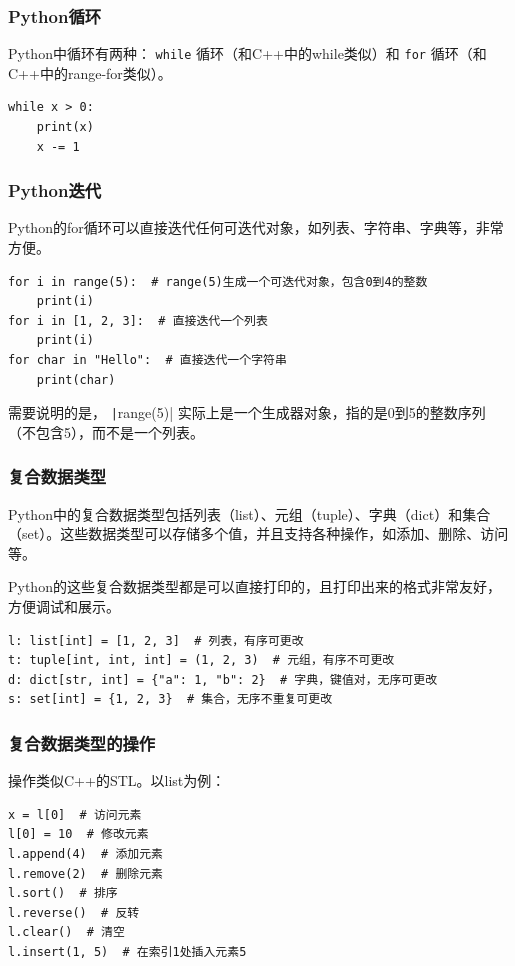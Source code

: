 \begin{frame}[fragile]
    \frametitle{Python循环}

    Python中循环有两种： \texttt{while} 循环（和C++中的while类似）和 \texttt{for} 循环（和C++中的range-for类似）。
    \begin{verbatim}
while x > 0:
    print(x)
    x -= 1
    \end{verbatim}
\end{frame}

\begin{frame}[fragile]
    \frametitle{Python迭代}

    Python的for循环可以直接迭代任何可迭代对象，如列表、字符串、字典等，非常方便。
    \begin{verbatim}
for i in range(5):  # range(5)生成一个可迭代对象，包含0到4的整数
    print(i)
for i in [1, 2, 3]:  # 直接迭代一个列表
    print(i)
for char in "Hello":  # 直接迭代一个字符串
    print(char)
    \end{verbatim}
    需要说明的是， \texttt|range(5)| 实际上是一个生成器对象，指的是0到5的整数序列（不包含5），而不是一个列表。
\end{frame}

\begin{frame}[fragile]
    \frametitle{复合数据类型}
    Python中的复合数据类型包括列表（list）、元组（tuple）、字典（dict）和集合（set）。这些数据类型可以存储多个值，并且支持各种操作，如添加、删除、访问等。

    Python的这些复合数据类型都是可以直接打印的，且打印出来的格式非常友好，方便调试和展示。

    \begin{verbatim}
l: list[int] = [1, 2, 3]  # 列表，有序可更改
t: tuple[int, int, int] = (1, 2, 3)  # 元组，有序不可更改
d: dict[str, int] = {"a": 1, "b": 2}  # 字典，键值对，无序可更改
s: set[int] = {1, 2, 3}  # 集合，无序不重复可更改
    \end{verbatim}

\end{frame}

\begin{frame}[fragile]
    \frametitle{复合数据类型的操作}

    操作类似C++的STL。以list为例：
    \begin{verbatim}
x = l[0]  # 访问元素
l[0] = 10  # 修改元素
l.append(4)  # 添加元素
l.remove(2)  # 删除元素
l.sort()  # 排序
l.reverse()  # 反转
l.clear()  # 清空
l.insert(1, 5)  # 在索引1处插入元素5
    \end{verbatim}

\end{frame}

